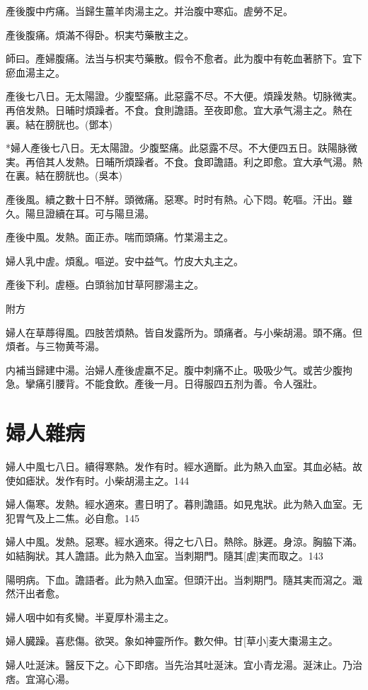 \documentclass[12pt,twoside,UTF8,b5paper]{ctexbook}
\begin{document}
產後腹中㽲痛。当歸生薑羊肉湯主之。并治腹中寒疝。虗勞不足。

產後腹痛。煩滿不得卧。枳実芍藥散主之。

師曰。產婦腹痛。法当与枳実芍藥散。假令不愈者。此为腹中有乾血著脐下。宜下瘀血湯主之。

產後七八日。无太陽證。少腹堅痛。此惡露不尽。不大便。煩躁发熱。切脉微実。再倍发熱。日晡时煩躁者。不食。食則譫語。至夜即愈。宜大承气湯主之。熱在裏。結在膀胱也。(鄧本)

*婦人產後七八日。无太陽證。少腹堅痛。此惡露不尽。不大便四五日。趺陽脉微実。再倍其人发熱。日晡所煩躁者。不食。食即譫語。利之即愈。宜大承气湯。熱在裏。結在膀胱也。(吳本)

產後風。續之數十日不觧。頭微痛。惡寒。时时有熱。心下悶。乾嘔。汗出。雖久。陽旦證續在耳。可与陽旦湯。

產後中風。发熱。面正赤。喘而頭痛。竹枼湯主之。

婦人乳中虗。煩亂。嘔逆。安中益气。竹皮大丸主之。

產後下利。虗極。白頭翁加甘草阿膠湯主之。

附方

婦人在草蓐得風。四肢苦煩熱。皆自发露所为。頭痛者。与小柴胡湯。頭不痛。但煩者。与三物黄芩湯。

内補当歸建中湯。治婦人產後虗羸不足。腹中刺痛不止。吸吸少气。或苦少腹拘急。攣痛引腰背。不能食飲。產後一月。日得服四五剂为善。令人强壯。

\chapter{婦人雜病}

婦人中風七八日。續得寒熱。发作有时。經水適斷。此为熱入血室。其血必結。故使如瘧狀。发作有时。小柴胡湯主之。144

婦人傷寒。发熱。經水適來。晝日明了。暮則譫語。如見鬼狀。此为熱入血室。无犯胃气及上二焦。必自愈。145

婦人中風。发熱。惡寒。經水適來。得之七八日。熱除。脉遲。身涼。胸脇下滿。如結胸狀。其人譫語。此为熱入血室。当刺期門。隨其[虗]実而取之。143

陽明病。下血。譫語者。此为熱入血室。但頭汗出。当刺期門。隨其実而瀉之。濈然汗出者愈。

婦人咽中如有炙臠。半夏厚朴湯主之。

婦人臓躁。喜悲傷。欲哭。象如神靈所作。數欠伸。甘[草小]麦大棗湯主之。

婦人吐涎沫。醫反下之。心下即痞。当先治其吐涎沫。宜小青龙湯。涎沫止。乃治痞。宜瀉心湯。
\end{document}
